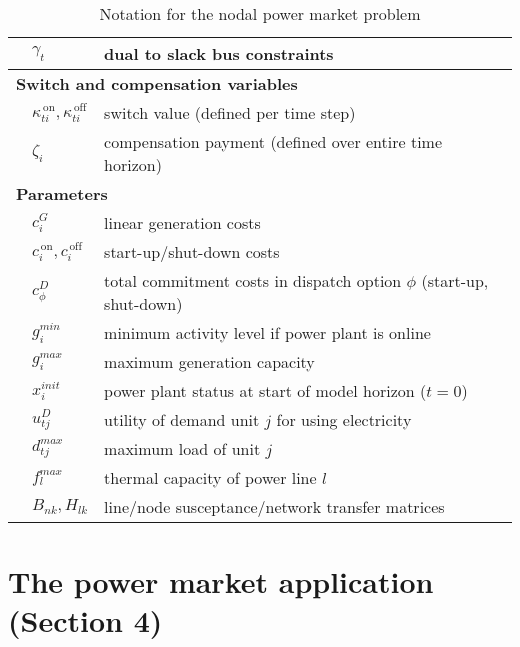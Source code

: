 \documentclass[9pt,a4paper]{article}
\newcommand{\on}{^{\,\text{on}}}
\newcommand{\off}{^{\,\text{off}}}
\begin{document}
\begin{table}
\begin{center}
\begin{small}
\begin{tabular}{p{0.1 cm}p{1.9 cm}@{ ... }p{8.5 cm}}
				&$\gamma_t$	& dual to slack bus constraints \\
				\hline
				\multicolumn{3}{l}{\textbf{Switch and compensation variables}} \\
				&$\kappa\on_{ti},\kappa\off_{ti}$	& switch value (defined per time step)\\
				&$\zeta_{i}$ & compensation payment (defined over entire time horizon) \\
				\hline
				\multicolumn{3}{l}{\textbf{Parameters}} \\
				&$c^G_{i}$		& linear generation costs \\
				&$c\on_i,c\off_i$		& start-up/shut-down costs \\
				&$c^D_{\phi}$		& total commitment costs in dispatch option $\phi$ (start-up, shut-down)\\
				&$g^{min}_i$		& minimum activity level if power plant is online \\
				&$g^{max}_i$		& maximum generation capacity \\
				&$x^{init}_i$		& power plant status at start of model horizon ($t=0$)\\
				&$u^D_{tj}$			& utility of demand unit $j$ for using electricity \\
				&$d^{max}_{tj}$	& maximum load of unit $j$ \\
				&$f^{max}_l$		& thermal capacity of power line $l$ \\
				&$B_{nk},H_{lk}$			& line/node susceptance/network transfer matrices \\
				\hline
				\hline
			\end{tabular}
		\end{small}
		\caption{Notation for the nodal power market problem} \label{table:example:notation}
	\end{center}
\end{table}

\section*{The power market application (Section 4)} \label{sec:example}
\end{document}
